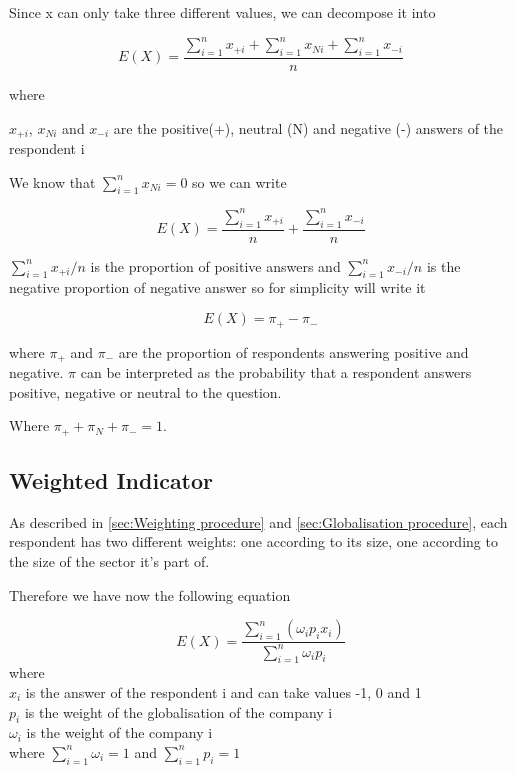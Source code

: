\documentclass[12pt,a4paper,oneside]{book}
\begin{document}
Since x can only take three different values, we can decompose it into 

\begin{equation}
    E(X) = \frac{ \sum_{i=1}^n x_{+i} + \sum_{i=1}^n x_{Ni} + \sum_{i=1}^n x_{-i}}{n}
\end{equation} 

where 

$x_{+i}$, $x_{Ni}$ and $x_{-i}$ are the positive(+), neutral (N) and negative (-) answers of the respondent i

We know that $\sum_{i=1}^n x_{Ni} = 0$ so we can write

\begin{equation}
    E(X) = \frac{\sum_{i=1}^n x_{+i}}{n}  + \frac{\sum_{i=1}^n x_{-i}}{n}
\end{equation} 

${\sum_{i=1}^n x_{+i}}/{n}$ is the proportion of positive answers and ${\sum_{i=1}^n x_{-i}}/{n}$ is the negative proportion of negative answer so for simplicity will write it 

\begin{equation}
    E(X) = \pi_+ - \pi_-
\end{equation}

where $\pi_+$ and $\pi_-$ are the proportion of respondents answering positive and negative. 
$\pi$ can be interpreted as the probability that a respondent answers positive, negative or neutral to the question. 

Where $\pi_+ + \pi_N + \pi_- =1$.


\subsection{Weighted Indicator}

As described in \autoref{sec:Weighting procedure} and \autoref{sec:Globalisation procedure}, each respondent has two different weights: one according to its size, one according to the size of the sector it's part of.

Therefore we have now the following equation

\begin{equation}
    E(X) = \frac{ \sum_{i=1}^n \left(\omega_i p_i x_i \right)}{\sum_{i=1}^n \omega_i p_i}
\end{equation} 
where \\
$x_i$ is the answer of the respondent i and can take values -1, 0 and 1 \\
$p_i$ is the weight of the globalisation of the company i \\
$\omega_i$ is the weight of the company i \\
where $\sum_{i=1}^n \omega_i = 1$ and $\sum_{i=1}^n p_i = 1$
\end{document}
